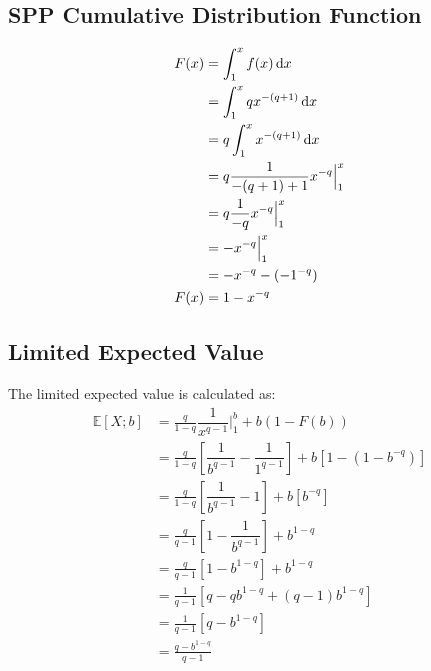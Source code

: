 \documentclass[]{article} %
\begin{document}
\subsection{SPP Cumulative Distribution Function}\label{ParetoF}
\begin{align}
	F(x) &= \int_{1}^{x} f(x) \operatorname{d \!} x \nonumber\\
		&= \int_{1}^{x}qx^{-(q+1)} \operatorname{d \!} x\nonumber\\
		&= q \int_{1}^{x}x^{-(q+1)} \operatorname{d \!} x\nonumber\\
		&= q \frac{1}{-(q+1)+1} x^{-q} \Big|_{1}^{x}\nonumber\\
		&=  q \frac{1}{-q} x^{-q} \Big|_{1}^{x}\nonumber\\
		&=  - x^{-q}\Big|_{1}^{x}\nonumber\\
		&= -x^{-q} - (-1^{-q})\nonumber\\
	 F(x) &=  1 - x^{-q}
\end{align}

\subsection{Limited Expected Value}\label{sec:ParetoLEV}
The limited expected value is calculated as:
\begin{align}
	\mathbb{E}[X;b] 	&= \frac{q}{1-q} \dfrac{1}{x^{q-1}} \Big|_{1}^{b} + b  (1-F(b))\nonumber\\
 	&=  \frac{q}{1-q} \left[ \dfrac{1}{b^{q-1}} - \dfrac{1}{1^{q-1}}\right]+  b  \left[1-(1-b^{-q})\right]\nonumber\\
 	&=  \frac{q}{1-q} \left[ \dfrac{1}{b^{q-1}} - 1\right]+  b  \left[b^{-q}\right]\nonumber\\
 	&=  \frac{q}{q-1} \left[1 - \dfrac{1}{b^{q-1}}\right]+ b^{1-q}\nonumber\\
 	&=  \frac{q}{q-1} \left[1 - b^{1-q}\right]+b^{1-q}\\ %
 	&=  \frac{1}{q-1} \left[q - qb^{1-q} + (q-1)b^{1-q}\right]\nonumber\\
 	&=  \frac{1}{q-1} \left[q - b^{1-q}\right]\nonumber\\
 	&=	\frac{q - b^{1-q}}{q-1}\label{eqn:ParetoLEV}
\end{align}


\end{document}
